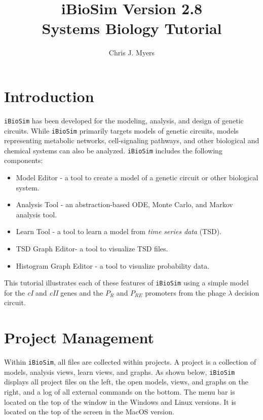 \documentclass[titlepage,11pt]{article}
\title{iBioSim Version 2.8 \\ Systems Biology Tutorial}
\author{Chris J. Myers}
\begin{document}
\maketitle

  
\tableofcontents

\clearpage

\section{Introduction}

\noindent
{\tt iBioSim} has been developed for the modeling, analysis, and design of genetic circuits.  While {\tt iBioSim} primarily targets models of genetic circuits, models representing metabolic networks, cell-signaling pathways, and other biological and chemical systems can also be analyzed.  {\tt iBioSim} includes the following components: 

\begin{itemize}
\item Model Editor - a tool to create a model of a genetic circuit or other biological system.
\item Analysis Tool - an abstraction-based ODE, Monte Carlo, and Markov analysis tool.
\item Learn Tool - a tool to learn a model from \emph{time series data} (TSD).
\item TSD Graph Editor- a tool to visualize TSD files. 
\item Histogram Graph Editor - a tool to visualize probability data. 
\end{itemize}

This tutorial illustrates each of these features of {\tt iBioSim} using a simple model for the \emph{cI} and \emph{cII} genes and the $P_R$ and $P_{RE}$ promoters from the phage $\lambda$ decision circuit.  


\section{Project Management}

\noindent
Within {\tt iBioSim}, all files are collected within projects.   A project is a collection of models, analysis views, learn views, and graphs.  As shown below, {\tt iBioSim} displays all project files on the left, the open models, views, and graphs on the right, and a log of all external commands on the bottom.  The menu bar is located on the top of the window in the Windows and Linux versions.  It is located on the top of the screen in the MacOS version.
\end{document}
